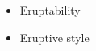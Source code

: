\documentclass{beamer}
\begin{document}
\begin{frame}
\begin{columns}[t]
    \begin{column}{0.33\paperwidth}
      \vspace{0.2cm}
      
        \begin{itemize}
        \item Eruptability
        \item Eruptive style
        \end{itemize}
    \end{column}

  \end{columns}
  \end{frame}




  
\end{document}
